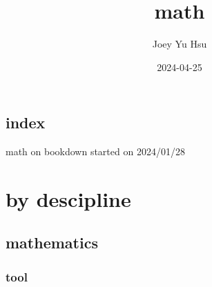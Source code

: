 \documentclass[
]{book}
\title{math}
\author{Joey Yu Hsu}
\date{2024-04-25}
\theoremstyle{definition}
\theoremstyle{definition}
\theoremstyle{definition}
\theoremstyle{definition}
\theoremstyle{remark}
\begin{document}
\maketitle

{
\hypersetup{linkcolor=}
\setcounter{tocdepth}{4}
\tableofcontents
}
\chapter*{index}\label{index}

math on bookdown started on 2024/01/28

\part{by descipline}\label{part-by-descipline}

\chapter{mathematics}\label{mathematics}

\section{tool}\label{tool}
\end{document}
